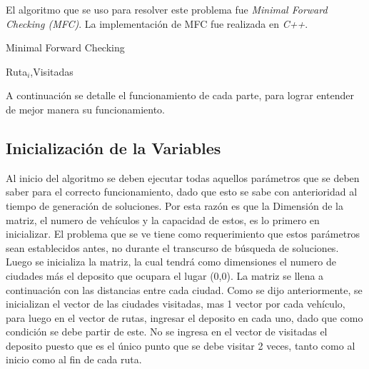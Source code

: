 \documentclass[letter, 10pt]{article}
\begin{document}
El algoritmo que se uso para resolver este problema fue \emph{Minimal Forward Checking (MFC)}. La implementaci\'on de MFC fue realizada en \emph{C++}.

\begin{algorithm}
  \caption{
    Minimal Forward Checking}
  \begin{algorithmic}[1]
       \REPEAT
	    \REPEAT
	      \ENDIF
	    \RETURN Ruta$_{i}$,Visitadas
	    \EndFunction
          \ENDFOR
        \end{algorithmic}
\end{algorithm}
A continuaci\'on se detalle el funcionamiento de cada parte, para lograr entender de mejor manera su funcionamiento.
\newpage
\subsection{Inicializaci\'on de la Variables}

Al inicio del algoritmo se deben ejecutar todas aquellos par\'ametros que se deben saber para el correcto funcionamiento, dado que esto se sabe con anterioridad al tiempo de generaci\'on de soluciones. 
Por esta raz\'on es que la Dimensi\'on de la matriz, el numero de veh\'iculos y la capacidad de estos, es lo primero en inicializar. El problema que se ve tiene como requerimiento que estos par\'ametros sean
establecidos antes, no durante el transcurso de b\'usqueda de soluciones.
Luego se inicializa la matriz, la cual tendr\'a como dimensiones el numero de ciudades m\'as el deposito que ocupara el lugar (0,0). La matriz se llena a continuaci\'on con las distancias entre cada ciudad.
Como se dijo anteriormente, se inicializan el vector de las ciudades visitadas, mas 1 vector por cada veh\'iculo, para luego en el vector de rutas, ingresar el deposito en cada uno, dado que como condici\'on
se debe partir de este. No se ingresa en el vector de visitadas el deposito puesto que es el \'unico punto que se debe visitar 2 veces, tanto como al inicio como al fin de cada ruta.
\end{document}

